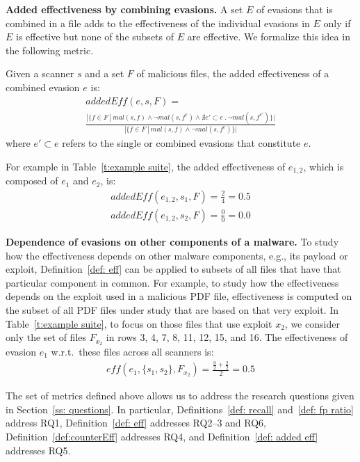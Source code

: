 \textbf{Added effectiveness by combining evasions.} A set $E$ of evasions that is combined in a file adds to the effectiveness of the individual evasions in $E$ only if $E$ is effective but none of the subsets of $E$ are effective.
We formalize this idea in the following metric.

\begin{definition}
Given a scanner $s$ and a set $F$ of malicious files, the added effectiveness of a combined evasion $e$ is:
\begin{multline*}
\mathit{addedEff}(e, s, F) =\\
\frac
{|\{ f \in F ~|~ \mathit{mal}(s,f) \wedge \neg \mathit{mal}(s,f^e) \wedge \nexists e' \subset e ~.~ \neg \mathit{mal}(s,f^{e'}) \}|}
{|\{ f \in F ~|~ \mathit{mal}(s,f) \wedge \neg \mathit{mal}(s,f^e) \}|}
\end{multline*}
where $e' \subset e$ refers to the single or combined evasions that constitute $e$.
\label{def: added eff}
\end{definition}

For example in Table~\ref{t:example suite}, the added effectiveness of $e_{1,2}$, which is composed of $e_1$ and $e_2$, is:
\begin{gather*}
\mathit{addedEff}(e_{1,2}, s_1, F) = \frac{2}{4} = 0.5 \\
\mathit{addedEff}(e_{1,2}, s_2, F) = \frac{0}{0} = 0.0
\end{gather*}


\textbf{Dependence of evasions on other components of a malware.}
To study how the effectiveness depends on other malware components, e.g., its payload or exploit,
Definition~\ref{def: eff} can be applied to subsets of all files that have that particular component in common.
For example, to study how the effectiveness depends on the exploit used in a malicious PDF file, effectiveness is computed on the subset of all PDF files under study that are based on that very exploit.
In Table~\ref{t:example suite}, to focus on those files that use exploit $x_2$, we consider only the set of files $F_{x_2}$ in rows 3, 4, 7, 8, 11, 12, 15, and 16.
The effectiveness of evasion $e_1$ w.r.t.\ these files across all scanners is:
\begin{gather*}
\mathit{eff}(e_{1}, \{s_1, s_2\}, F_{x_2}) = \frac{\frac{0}{2} + \frac{2}{2}}{2} = 0.5
\end{gather*}



\medskip
The set of metrics defined above allows us to address the research questions given in Section~\ref{ss: questions}.
In particular, Definitions~\ref{def: recall} and~\ref{def: fp ratio} address RQ1, Definition~\ref{def: eff} addresses RQ2--3 and RQ6, Definition~\ref{def:counterEff} addresses RQ4, and Definition~\ref{def: added eff} addresses RQ5.

